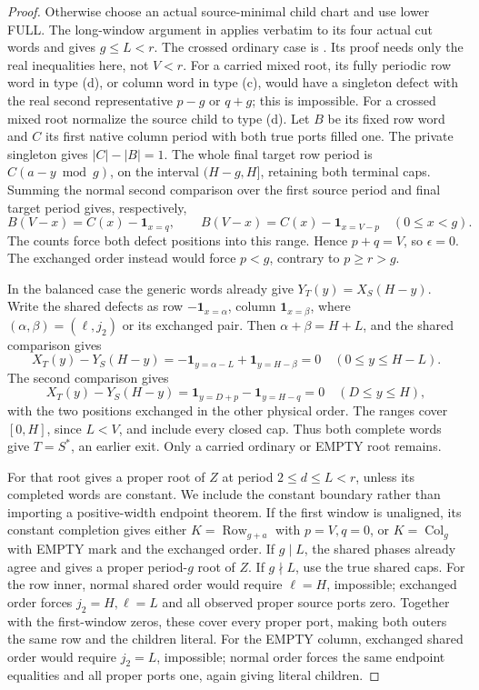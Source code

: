 \documentclass[11pt,a4paper]{amsart}
\numberwithin{equation}{section}
\theoremstyle{plain}
\theoremstyle{definition}
\newcommand{\one}{\mathbf1}
\newcommand{\Row}{\operatorname{Row}}
\newcommand{\Col}{\operatorname{Col}}
\begin{document}
\begin{proof}
Otherwise choose an actual source-minimal child chart and use lower FULL.
The long-window argument in  applies verbatim
to its four actual cut words and gives \(g\le L<r\).  The crossed
ordinary case is .  Its proof needs only the
real inequalities here, not \(V<r\).  For a carried mixed root, its fully periodic row word in type (d),
or column word in type (c), would have a singleton defect with the
real second representative \(p-g\) or \(q+g\); this is impossible.
For a crossed mixed root normalize the source child to type (d).
Let \(B\) be its fixed row word and \(C\) its first native column
period with both true ports filled one.  The private singleton gives
\(|C|-|B|=1\).  The whole final target row period is
\(C(a-y\bmod g)\), on the interval \((H-g,H]\), retaining
both terminal caps.  Summing the normal second comparison over the
first source period and final target period gives, respectively,
\[
 B(V-x)=C(x)-\one_{x=q},\qquad
 B(V-x)=C(x)-\one_{x=V-p}\quad(0\le x<g).
\]
The counts force both defect positions into this range.  Hence
\(p+q=V\), so \(\epsilon=0\).  The exchanged order instead
would force \(p<g\), contrary to \(p\ge r>g\).

In the balanced case the generic words already give
\(Y_T(y)=X_S(H-y)\).  Write the shared defects as row
\(-\one_{x=\alpha}\), column \(\one_{x=\beta}\), where
\((\alpha,\beta)=(\ell,j_2)\) or its exchanged pair.
Then \(\alpha+\beta=H+L\), and the shared comparison gives
\[
 X_T(y)-Y_S(H-y)
 =-\one_{y=\alpha-L}+\one_{y=H-\beta}=0
                         \quad(0\le y\le H-L).
\]
The second comparison gives
\[
 X_T(y)-Y_S(H-y)
 =\one_{y=D+p}-\one_{y=H-q}=0\quad(D\le y\le H),
\]
with the two positions exchanged in the other physical order.
The ranges cover \([0,H]\), since \(L<V\), and include every
closed cap.  Thus both complete words give \(T=S^*\), an earlier
exit.  Only a carried ordinary or EMPTY root remains.

For that root  gives a proper root of \(Z\) at
period \(2\le d\le L<r\), unless its completed words are constant.
We include the constant boundary rather than importing a positive-width
endpoint theorem.  If the first window is unaligned, its constant
completion gives either \(K=\Row_{g+a}\) with \(p=V,q=0\), or
\(K=\Col_g\) with EMPTY mark and the exchanged order.  If \(g\mid L\),
the shared phases already agree and \cite[Recovery from the generic words]{Shields2026Gluing} gives a proper
period-\(g\) root of \(Z\).  If \(g\nmid L\), use the true shared
caps.  For the row inner, normal shared order would require
\(\ell=H\), impossible; exchanged order forces
\(j_2=H,\ell=L\) and all observed proper source ports zero.  Together
with the first-window zeros, these cover every proper port, making both
outers the same row and the children literal.  For the EMPTY column,
exchanged shared order would require \(j_2=L\), impossible; normal
order forces the same endpoint equalities and all proper ports one,
again giving literal children.


\end{proof}
\end{document}
